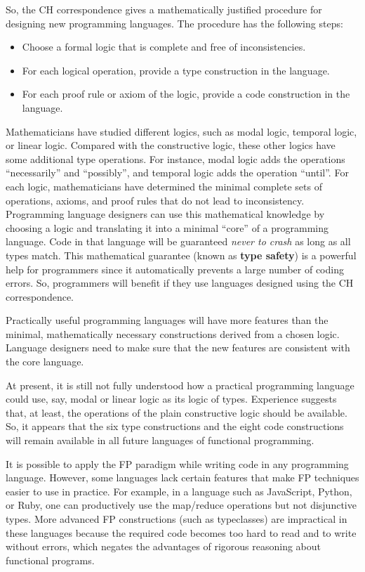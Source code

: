 So, the CH correspondence gives a mathematically justified procedure
for designing new programming languages. The procedure has the following
steps:
\begin{itemize}
\item Choose a formal logic that is complete and free of inconsistencies.
\item For each logical operation, provide a type construction in the language.
\item For each proof rule or axiom of the logic, provide a code construction
in the language.
\end{itemize}
Mathematicians have studied different logics, such as modal logic,
temporal logic, or linear logic. Compared with the constructive logic,
these other logics have some additional type operations. For instance,
modal logic adds the operations \textsf{``}necessarily\textsf{''} and \textsf{``}possibly\textsf{''},
and temporal logic adds the operation \textsf{``}until\textsf{''}. For each logic,
mathematicians have determined the minimal complete sets of operations,
axioms, and proof rules that do not lead to inconsistency. Programming
language designers can use this mathematical knowledge by choosing
a logic and translating it into a minimal \textsf{``}core\textsf{''} of a programming
language. Code in that language will be guaranteed \emph{never to
crash} as long as all types match. This mathematical guarantee (known
as \textbf{type safety}) is a powerful help for
programmers since it automatically prevents a large number of coding
errors. So, programmers will benefit if they use languages designed
using the CH correspondence.

Practically useful programming languages will have more features than
the minimal, mathematically necessary constructions derived from a
chosen logic. Language designers need to make sure that the new features
are consistent with the core language. 

At present, it is still not fully understood how a practical programming
language could use, say, modal or linear logic as its logic of types.
Experience suggests that, at least, the operations of the plain constructive
logic should be available. So, it appears that the six type constructions
and the eight code constructions will remain available in all future
languages of functional programming. 

It is possible to apply the FP paradigm while writing code in any
programming language. However, some languages lack certain features
that make FP techniques easier to use in practice. For example, in
a language such as JavaScript, Python, or Ruby, one can productively
use the map/reduce operations but not disjunctive types. More advanced
FP constructions (such as typeclasses) are impractical in these languages
because the required code becomes too hard to read and to write without
errors, which negates the advantages of rigorous reasoning about functional
programs.

